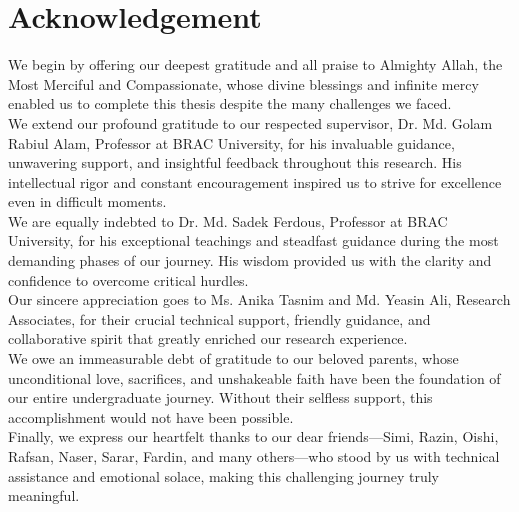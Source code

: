 \section*{Acknowledgement}
We begin by offering our deepest gratitude and all praise to Almighty Allah, the Most Merciful and Compassionate, whose divine blessings and infinite mercy enabled us to complete this thesis despite the many challenges we faced.\\

We extend our profound gratitude to our respected supervisor, Dr. Md. Golam Rabiul Alam, Professor at BRAC University, for his invaluable guidance, unwavering support, and insightful feedback throughout this research. His intellectual rigor and constant encouragement inspired us to strive for excellence even in difficult moments.\\

We are equally indebted to Dr. Md. Sadek Ferdous, Professor at BRAC University, for his exceptional teachings and steadfast guidance during the most demanding phases of our journey. His wisdom provided us with the clarity and confidence to overcome critical hurdles.\\

Our sincere appreciation goes to Ms. Anika Tasnim and Md. Yeasin Ali, Research Associates, for their crucial technical support, friendly guidance, and collaborative spirit that greatly enriched our research experience.\\

We owe an immeasurable debt of gratitude to our beloved parents, whose unconditional love, sacrifices, and unshakeable faith have been the foundation of our entire undergraduate journey. Without their selfless support, this accomplishment would not have been possible.\\

Finally, we express our heartfelt thanks to our dear friends—Simi, Razin, Oishi, Rafsan, Naser, Sarar, Fardin, and many others—who stood by us with technical assistance and emotional solace, making this challenging journey truly meaningful.
